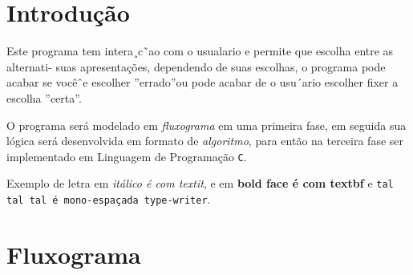 \documentclass[a4paper,12pt]{article} %
\begin{document}
\section{Introdução}


Este programa tem intera¸c˜ao com o usualario e permite que escolha entre as alternati-
suas apresentações, dependendo de suas escolhas, o programa pode acabar se vocêˆe escolher
”errado”ou pode acabar de o usu´ario escolher fixer a escolha ”certa”.

O programa será modelado em \textit{fluxograma} em uma primeira fase, em seguida
sua lógica será desenvolvida em formato de \textit{algoritmo}, para então
na terceira fase ser implementado em Linguagem de Programação \texttt{C}.

Exemplo de letra em \textit{itálico é com textit}, e em \textbf{bold face é com textbf} e \texttt{tal tal tal é mono-espaçada type-writer}.

\section{Fluxograma}

\end{document}

